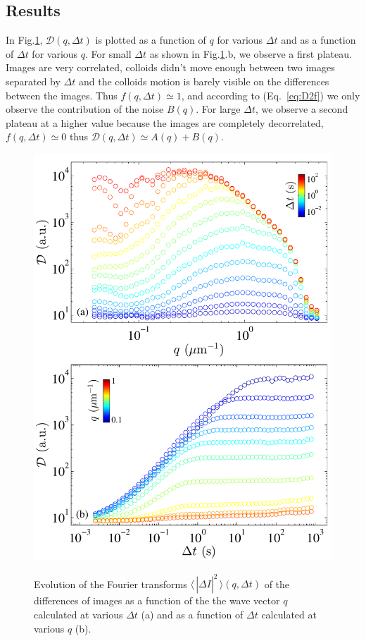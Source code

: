 \documentclass[%
 aip,
 jmp,%
 amsmath,amssymb,
reprint,%
]{revtex4-1}
\begin{document}
\subsection{Results}
\label{resultcolloid}

In Fig.\ref{D}, $\mathcal{D}(q, \Delta t)$ is plotted as a function of $q$ for various $\Delta t$ and as a function of $\Delta t$ for various $q$. For small $\Delta t$  as shown in Fig.\ref{D}.b, we observe a first plateau. Images are very correlated, colloids didn't move enough between two images separated by $\Delta t$ and the colloids motion is barely visible on the differences between the images. Thus $f(q, \Delta t) \simeq 1$, and according to (Eq.~\ref{eq:D2f}) we only observe the contribution of the noise $B(q)$. For large $\Delta t$, we observe a second plateau at a higher value because the images are completely decorrelated, $f(q, \Delta t) \simeq 0$ thus $\mathcal{D}(q, \Delta t) \simeq A(q)+B(q)$.

\begin{figure}
	\includegraphics[width=\linewidth]{D_fonction_q_et_Deltat.pdf}\\
	\caption{Evolution of the Fourier transforms $\langle \, |\widehat{\Delta I}|^2 \, \rangle (q, \Delta t)$ of the differences of images as a function of the the wave vector $q$ calculated at various $\Delta t$ (a) and as a function of $\Delta t$ calculated at various $q$ (b).}
	\label{D}
\end{figure}
\end{document}
